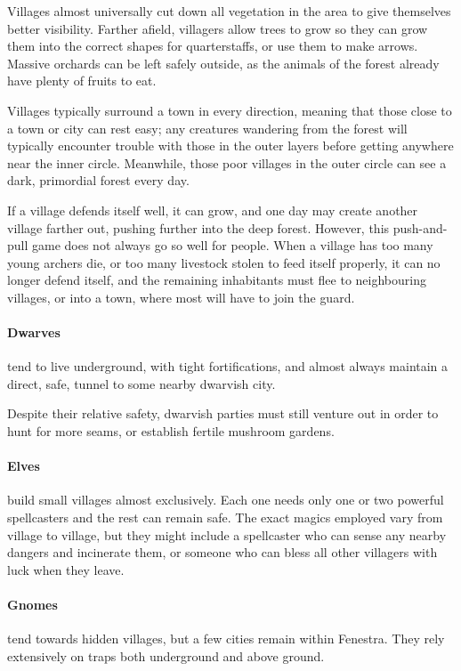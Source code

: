 \begin{multicols}{2}
Villages almost universally cut down all vegetation in the area to give themselves better visibility.
Farther afield, villagers allow trees to grow so they can grow them into the correct shapes for quarterstaffs, or use them to make arrows.
Massive orchards can be left safely outside, as the animals of the forest already have plenty of fruits to eat.

Villages typically surround a town in every direction, meaning that those close to a town or city can rest easy;
any creatures wandering from the forest will typically encounter trouble with those in the outer layers before getting anywhere near the inner circle.
Meanwhile, those poor villages in the outer circle can see a dark, primordial forest every day.

If a village defends itself well, it can grow, and one day may create another village farther out, pushing further into the deep forest.
However, this push-and-pull game does not always go so well for people.
When a village has too many young archers die, or too many livestock stolen to feed itself properly, it can no longer defend itself, and the remaining inhabitants must flee to neighbouring villages, or into a town, where most will have to join the \gls{guard}.

\paragraph{Dwarves} tend to live underground, with tight fortifications, and almost always maintain a direct, safe, tunnel to some nearby dwarvish city.

Despite their relative safety, dwarvish parties must still venture out in order to hunt for more seams, or establish fertile mushroom gardens.

\paragraph{Elves} build small villages almost exclusively.
Each one needs only one or two powerful spellcasters and the rest can remain safe.
The exact magics employed vary from village to village, but they might include a spellcaster who can sense any nearby dangers and incinerate them, or someone who can bless all other villagers with luck when they leave.

\paragraph{Gnomes} tend towards hidden villages, but a few cities remain within Fenestra.
They rely extensively on traps both underground and above ground.


\end{multicols}
